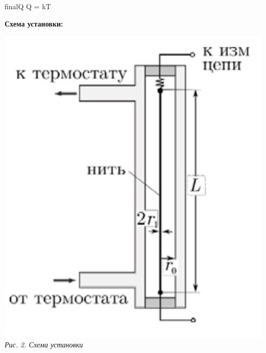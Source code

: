 \formula
{}
{finalQ}
{Q =  k\cdot \Delta T}

\vspace{1cm}

\begin{center}
    {\bf\Large
    Схема установки:}
    
    \includegraphics[scale=0.5]{picks/2_2_3_scheme2.jpg} \\
    \textit{\textcolor[HTML]{000000}{Рис. 2. Схема установки}}
    
\end{center}

\newpage